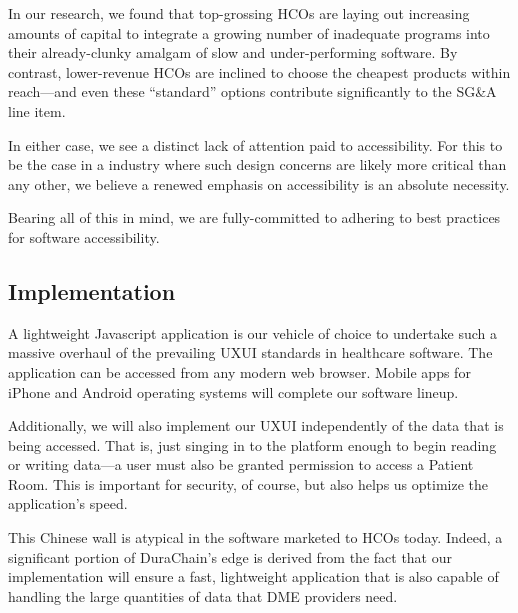 In our research, we found that top-grossing HCOs are laying out increasing amounts of capital to integrate a growing number of inadequate programs into their already-clunky amalgam of slow and under-performing software. By contrast, lower-revenue HCOs are inclined to choose the cheapest products within reach---and even these ``standard'' options contribute significantly to the SG\&A line item.%

In either case, we see a distinct lack of attention paid to accessibility. For this to be the case in a industry where such design concerns are likely more critical than any other, we believe a renewed emphasis on accessibility is an absolute necessity.%

Bearing all of this in mind, we are fully-committed to adhering to best practices for software accessibility.%

\subsection{Implementation}
A lightweight Javascript application is our vehicle of choice to undertake such a massive overhaul of the prevailing UXUI standards in healthcare software. The application can be accessed from any modern web browser. Mobile apps for iPhone and Android operating systems will complete our software lineup.%

Additionally, we will also implement our UXUI independently of the data that is being accessed. That is, just singing in to the platform enough to begin reading or writing data---a user must also be granted permission to access a Patient Room. This is important for security, of course, but also helps us optimize the application's speed.%

This Chinese wall is atypical in the software marketed to HCOs today. Indeed, a significant portion of DuraChain's edge is derived from the fact that our implementation will ensure a fast, lightweight application that is also capable of handling the large quantities of data that DME providers need.%
